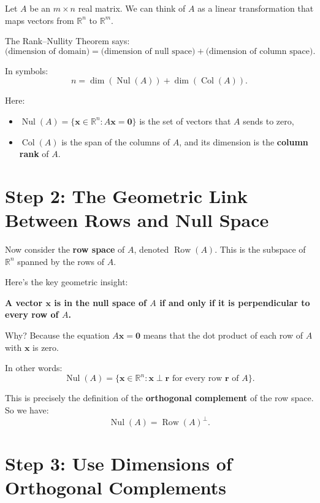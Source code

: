 Let $ A $ be an $ m \times n $ real matrix.  
We can think of $ A $ as a linear transformation that maps vectors from $ \mathbb{R}^n $ to $ \mathbb{R}^m $.

The Rank--Nullity Theorem says:
\[
\text{(dimension of domain)} = \text{(dimension of null space)} + \text{(dimension of column space)}.
\]

In symbols:
\[
n = \dim(\operatorname{Nul}(A)) + \dim(\operatorname{Col}(A)).
\tag{1}
\]

Here:
\begin{itemize}
\item $ \operatorname{Nul}(A) = \{ \mathbf{x} \in \mathbb{R}^n : A\mathbf{x} = \mathbf{0} \} $ is the set of vectors that $ A $ sends to zero,
    \item $ \operatorname{Col}(A) $ is the span of the columns of $ A $, and its dimension is the \textbf{column rank} of $ A $.
\end{itemize}

\section*{Step 2: The Geometric Link Between Rows and Null Space}

Now consider the \textbf{row space} of $ A $, denoted $ \operatorname{Row}(A) $.  
This is the subspace of $ \mathbb{R}^n $ spanned by the rows of $ A $.

Here’s the key geometric insight:

\begin{center}
\textbf{A vector $ \mathbf{x} $ is in the null space of $ A $ if and only if it is perpendicular to every row of $ A $.}
\end{center}

Why? Because the equation $ A\mathbf{x} = \mathbf{0} $ means that the dot product of each row of $ A $ with $ \mathbf{x} $ is zero.

In other words:
\[
\operatorname{Nul}(A) = \{ \mathbf{x} \in \mathbb{R}^n : \mathbf{x} \perp \mathbf{r} \text{ for every row } \mathbf{r} \text{ of } A \}.
\]

This is precisely the definition of the \textbf{orthogonal complement} of the row space. So we have:
\[
\operatorname{Nul}(A) = \operatorname{Row}(A)^\perp.
\tag{2}
\]

\section*{Step 3: Use Dimensions of Orthogonal Complements}

